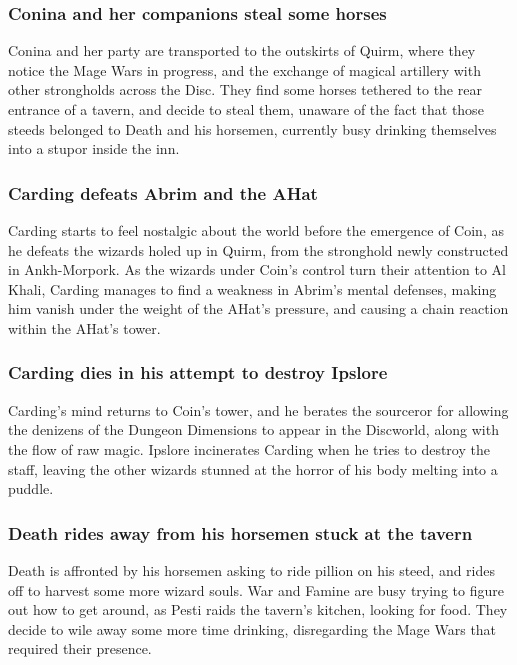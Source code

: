 \subsubsection{\Gls{Conina} and her companions steal some horses}
\Gls{Conina} and her party are transported to the outskirts of Quirm, where they notice the Mage
Wars in progress, and the exchange of magical artillery with other strongholds across the Disc.
They find some horses tethered to the rear entrance of a tavern, and decide to steal them, unaware
of the fact that those steeds belonged to \Gls{Death} and his horsemen, currently busy drinking
themselves into a stupor inside the inn.

\subsubsection{\Gls{Carding} defeats \Gls{Abrim} and the \Gls{AHat}}
\Gls{Carding} starts to feel nostalgic about the world before the emergence of \Gls{Coin}, as he
defeats the wizards holed up in Quirm, from the stronghold newly constructed in Ankh-Morpork.
As the wizards under \Gls{Coin}'s control turn their attention to Al Khali, \Gls{Carding} manages
to find a weakness in \Gls{Abrim}'s mental defenses, making him vanish under the weight of the
\Gls{AHat}'s pressure, and causing a chain reaction within the \Gls{AHat}'s tower.

\subsubsection{\Gls{Carding} dies in his attempt to destroy \Gls{Ipslore}}
\Gls{Carding}'s mind returns to \Gls{Coin}'s tower, and he berates the sourceror for allowing
the denizens of the Dungeon Dimensions to appear in the Discworld, along with the flow of raw magic.
\Gls{Ipslore} incinerates \Gls{Carding} when he tries to destroy the staff, leaving the other
wizards stunned at the horror of his body melting into a puddle.

\subsubsection{\Gls{Death} rides away from his horsemen stuck at the tavern}
\Gls{Death} is affronted by his horsemen asking to ride pillion on his steed, and rides off to
harvest some more wizard souls. \Gls{War} and \Gls{Famine} are busy trying to figure out how to
get around, as \Gls{Pesti} raids the tavern's kitchen, looking for food. They decide to wile away
some more time drinking, disregarding the Mage Wars that required their presence.

